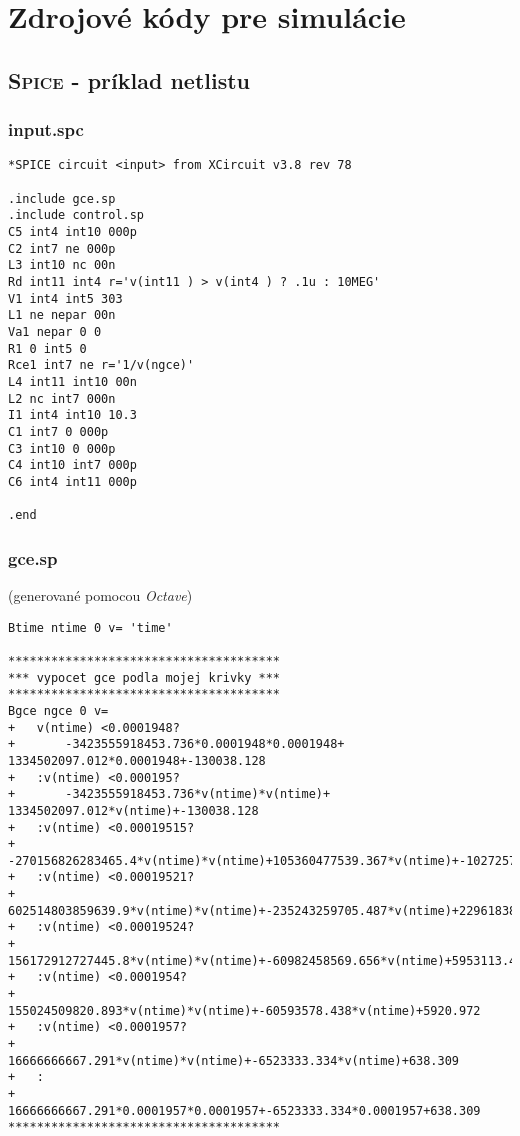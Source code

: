 \chapter{Zdrojové kódy pre simulácie} \label{ch:priloha_sim}

\section{\textsc{Spice} - príklad netlistu}

\subsection{input.spc}

\begin{lstlisting}
*SPICE circuit <input> from XCircuit v3.8 rev 78

.include gce.sp
.include control.sp
C5 int4 int10 000p
C2 int7 ne 000p
L3 int10 nc 00n
Rd int11 int4 r='v(int11 ) > v(int4 ) ? .1u : 10MEG'
V1 int4 int5 303
L1 ne nepar 00n
Va1 nepar 0 0
R1 0 int5 0
Rce1 int7 ne r='1/v(ngce)'
L4 int11 int10 00n
L2 nc int7 000n
I1 int4 int10 10.3
C1 int7 0 000p
C3 int10 0 000p
C4 int10 int7 000p
C6 int4 int11 000p

.end
\end{lstlisting}

\newpage
\subsection{gce.sp}
(generované pomocou \textit{Octave})

\begin{lstlisting}
Btime ntime 0 v= 'time'

**************************************
*** vypocet gce podla mojej krivky ***
**************************************
Bgce ngce 0 v=
+	v(ntime) <0.0001948?
+		-3423555918453.736*0.0001948*0.0001948+ 1334502097.012*0.0001948+-130038.128
+	:v(ntime) <0.000195?
+		-3423555918453.736*v(ntime)*v(ntime)+ 1334502097.012*v(ntime)+-130038.128
+	:v(ntime) <0.00019515?
+		-270156826283465.4*v(ntime)*v(ntime)+105360477539.367*v(ntime)+-10272570.734
+	:v(ntime) <0.00019521?
+		602514803859639.9*v(ntime)*v(ntime)+-235243259705.487*v(ntime)+22961838.928
+	:v(ntime) <0.00019524?
+		156172912727445.8*v(ntime)*v(ntime)+-60982458569.656*v(ntime)+5953113.433
+	:v(ntime) <0.0001954?
+		155024509820.893*v(ntime)*v(ntime)+-60593578.438*v(ntime)+5920.972
+	:v(ntime) <0.0001957?
+		16666666667.291*v(ntime)*v(ntime)+-6523333.334*v(ntime)+638.309
+	:
+		16666666667.291*0.0001957*0.0001957+-6523333.334*0.0001957+638.309
**************************************
\end{lstlisting}


